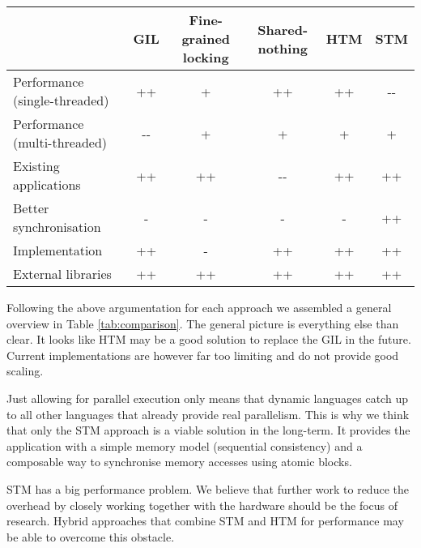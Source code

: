 \documentclass{sigplanconf}
\begin{document}
\begin{table*}[!ht]
  \centering
  \begin{tabular}{|l|c|c|c|c|c|}
    \hline
    & \textbf{GIL} & \textbf{Fine-grained locking}
    & \textbf{Shared-nothing} & \textbf{HTM} & \textbf{STM}\\
    \hline
    Performance (single-threaded) & ++   & +  & ++   & ++ & -{-} \\
    \hline
    Performance (multi-threaded)  & -{-} & +  & +    & +  & +    \\
    \hline
    Existing applications         & ++   & ++ & -{-} & ++ & ++   \\
    \hline
    Better synchronisation        & -    & -  & -    & -  & ++   \\
    \hline
    Implementation                & ++   & -  & ++   & ++ & ++   \\
    \hline
    External libra\-ries          & ++   & ++ & ++   & ++ & ++   \\
    \hline
  \end{tabular}
  \caption{Comparison between the approaches (-{-}/-/o/+/++)}
  \label{tab:comparison}
\end{table*}


Following the above argumentation for each approach we assembled a
general overview in Table \ref{tab:comparison}. The general picture is
everything else than clear. It looks like HTM may be a good solution
to replace the GIL in the future. Current implementations are however
far too limiting and do not provide good scaling.

Just allowing for parallel execution only means that dynamic languages
catch up to all other languages that already provide real
parallelism. This is why we think that only the STM approach is a
viable solution in the long-term. It provides the application with a
simple memory model (sequential consistency) and a composable way to
synchronise memory accesses using atomic blocks.

STM has a big performance problem. We believe that further work
to reduce the overhead by closely working together with the
hardware should be the focus of research. Hybrid approaches that
combine STM and HTM for performance may be able to overcome this
obstacle.




\end{document}

